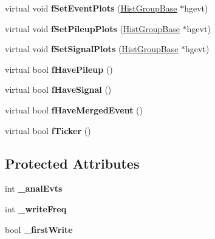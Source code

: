 \begin{CompactItemize}
\item 
\hypertarget{classUserAnalysisBase_51efc6f7809d7653b018910507667f3e}{
virtual void \textbf{f\-Set\-Event\-Plots} (\hyperlink{classHistGroupBase}{Hist\-Group\-Base} $\ast$hgevt)}
\label{classUserAnalysisBase_51efc6f7809d7653b018910507667f3e}

\item 
\hypertarget{classUserAnalysisBase_60248dda11b1cf1976f54ca95c666f69}{
virtual void \textbf{f\-Set\-Pileup\-Plots} (\hyperlink{classHistGroupBase}{Hist\-Group\-Base} $\ast$hgevt)}
\label{classUserAnalysisBase_60248dda11b1cf1976f54ca95c666f69}

\item 
\hypertarget{classUserAnalysisBase_d59a73ef732281d8b0bf1908f19e1b02}{
virtual void \textbf{f\-Set\-Signal\-Plots} (\hyperlink{classHistGroupBase}{Hist\-Group\-Base} $\ast$hgevt)}
\label{classUserAnalysisBase_d59a73ef732281d8b0bf1908f19e1b02}

\item 
\hypertarget{classUserAnalysisBase_9baca7c00d6302fa4af702c38e5b8453}{
virtual bool \textbf{f\-Have\-Pileup} ()}
\label{classUserAnalysisBase_9baca7c00d6302fa4af702c38e5b8453}

\item 
\hypertarget{classUserAnalysisBase_a55d3cdf2f2d2ac3611b9870e7db1008}{
virtual bool \textbf{f\-Have\-Signal} ()}
\label{classUserAnalysisBase_a55d3cdf2f2d2ac3611b9870e7db1008}

\item 
\hypertarget{classUserAnalysisBase_f7e8d40d31657bff1b9ab0c84f32799a}{
virtual bool \textbf{f\-Have\-Merged\-Event} ()}
\label{classUserAnalysisBase_f7e8d40d31657bff1b9ab0c84f32799a}

\item 
\hypertarget{classUserAnalysisBase_8dbd5bf590d3965042a4844957ee0811}{
virtual bool \textbf{f\-Ticker} ()}
\label{classUserAnalysisBase_8dbd5bf590d3965042a4844957ee0811}

\end{CompactItemize}
\subsection*{Protected Attributes}
\begin{CompactItemize}
\item 
\hypertarget{classUserAnalysisBase_4c0f8db7506f65e168e0950cc9bd0d60}{
int \textbf{\_\-anal\-Evts}}
\label{classUserAnalysisBase_4c0f8db7506f65e168e0950cc9bd0d60}

\item 
\hypertarget{classUserAnalysisBase_4268e1629f4c54ae675d118894d32909}{
int \textbf{\_\-write\-Freq}}
\label{classUserAnalysisBase_4268e1629f4c54ae675d118894d32909}

\item 
\hypertarget{classUserAnalysisBase_cdf916f686f68810dc198641fb068079}{
bool \textbf{\_\-first\-Write}}
\label{classUserAnalysisBase_cdf916f686f68810dc198641fb068079}

\end{CompactItemize}
